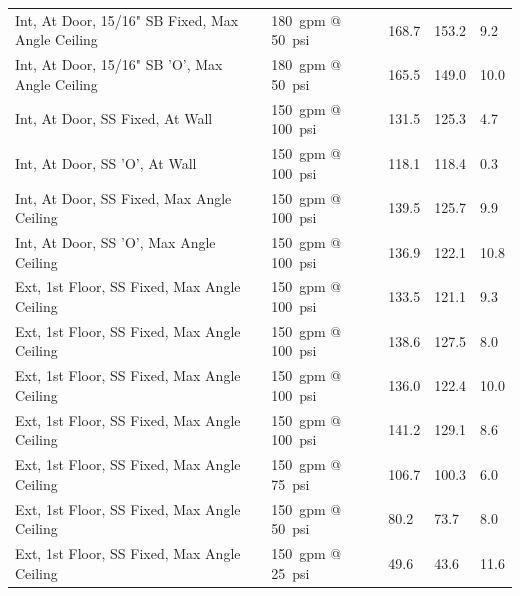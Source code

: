 \documentclass[12pt,oneside]{book}
\begin{document}
\begin{table}[!ht]
\begin{tabular}{lllll}
Int, At Door, 15/16" SB Fixed, Max Angle Ceiling      & 180~gpm @ 50~psi               & 168.7                             & 153.2                              & 9.2                    \\
Int, At Door, 15/16" SB 'O', Max Angle Ceiling        & 180~gpm @ 50~psi               & 165.5                             & 149.0                              & 10.0                   \\
Int, At Door, SS Fixed, At Wall                       & 150~gpm @ 100~psi              & 131.5                             & 125.3                              & 4.7                    \\
Int, At Door, SS 'O', At Wall                         & 150~gpm @ 100~psi              & 118.1                             & 118.4                              & 0.3                    \\
Int, At Door, SS Fixed, Max Angle Ceiling             & 150~gpm @ 100~psi              & 139.5                             & 125.7                              & 9.9                    \\
Int, At Door, SS 'O', Max Angle Ceiling               & 150~gpm @ 100~psi              & 136.9                             & 122.1                              & 10.8                   \\
Ext, 1st Floor, SS Fixed, Max Angle Ceiling           & 150~gpm @ 100~psi              & 133.5                             & 121.1                              & 9.3                    \\
Ext, 1st Floor, SS Fixed, Max Angle Ceiling           & 150~gpm @ 100~psi              & 138.6                             & 127.5                              & 8.0                    \\
Ext, 1st Floor, SS Fixed, Max Angle Ceiling           & 150~gpm @ 100~psi              & 136.0                             & 122.4                              & 10.0                   \\
Ext, 1st Floor, SS Fixed, Max Angle Ceiling           & 150~gpm @ 100~psi              & 141.2                             & 129.1                              & 8.6                    \\
Ext, 1st Floor, SS Fixed, Max Angle Ceiling           & 150~gpm @ 75~psi               & 106.7                             & 100.3                              & 6.0                    \\
Ext, 1st Floor, SS Fixed, Max Angle Ceiling           & 150~gpm @ 50~psi               &  80.2                             & 73.7                               & 8.0                    \\
Ext, 1st Floor, SS Fixed, Max Angle Ceiling           & 150~gpm @ 25~psi               &  49.6                             & 43.6                               & 11.6                   \\                   
\bottomrule[1.25pt]
\end{tabular}
\end{table}
\end{document}
